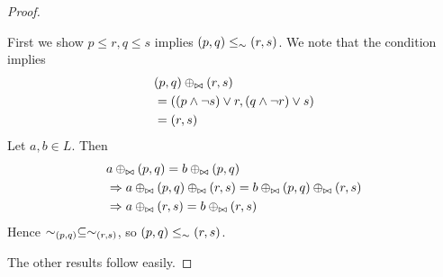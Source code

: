 \booleanAlgebraKernels*
\begin{proof}
  \label{prf:booleanAlgebraKernels}

  First we show $p \leq r, q \leq s$ implies $(p, q) \leq_\sim (r, s)$. We
  note that the condition implies
  \begin{align*}
    &(p, q) \oplus_{\bowtie} (r,s)\\
    &= ((p \wedge \neg s) \vee r, (q \wedge \neg r) \vee s)\\
    &= (r,s)
  \end{align*}
  Let $a, b \in L$. Then
  \begin{align*}
    &a \oplus_{\bowtie} (p, q) = b \oplus_{\bowtie} (p, q)\\
    &\Rightarrow a \oplus_{\bowtie} (p, q) \oplus_{\bowtie} (r, s) = b \oplus_{\bowtie} (p, q) \oplus_{\bowtie} (r, s)\\
    &\Rightarrow a \oplus_{\bowtie} (r, s) = b \oplus_{\bowtie} (r, s)
  \end{align*}
  Hence $\sim_{(p,q)} \subseteq \sim_{(r,s)}$, so $(p, q) \leq_\sim (r, s)$.
 
  The other results follow easily.
\end{proof}

